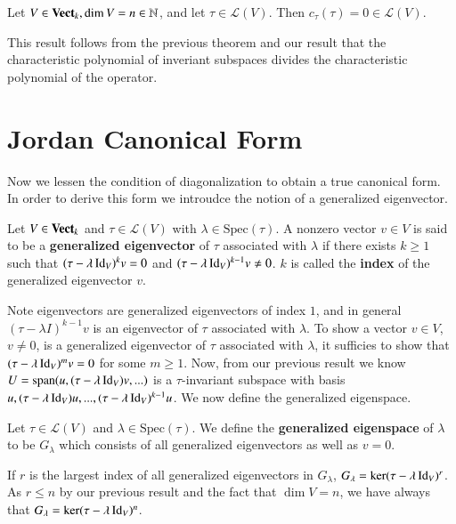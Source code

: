 \begin{theorem}
    Let $V \in \normalfont\textbf{Vect}_{k},\dim V = n\in \mathbb N$, and let $\tau \in \mathcal{L}(V)$. Then $c_{\tau}(\tau) = 0 \in \mathcal{L}(V)$.
\end{theorem}

This result follows from the previous theorem and our result that the characteristic polynomial of inveriant subspaces divides the characteristic polynomial of the operator.


\section{Jordan Canonical Form}\label{sec:Jord}

Now we lessen the condition of diagonalization to obtain a true canonical form. In order to derive this form we introudce the notion of a generalized eigenvector.

\begin{definition}
    Let $V \in \normalfont\textbf{Vect}_{k}$ and $\tau \in \mathcal{L}(V)$ with $\lambda \in \text{Spec}(\tau)$. A nonzero vector $v \in V$ is said to be a \textbf{generalized eigenvector} of $\tau$ associated with $\lambda$ if there exists $k \geq 1$ such that $(\tau-\lambda \operatorname{Id}_V)^kv = 0$ and $(\tau - \lambda \operatorname{Id}_V)^{k-1}v \neq 0$. $k$ is called the \textbf{index} of the generalized eigenvector $v$.
\end{definition}

Note eigenvectors are generalized eigenvectors of index $1$, and in general $(\tau-\lambda I)^{k-1}v$ is an eigenvector of $\tau$ associated with $\lambda$. To show a vector $v \in V$, $v\neq 0$, is a generalized eigenvector of $\tau$ associated with $\lambda$, it sufficies to show that $(\tau - \lambda \operatorname{Id}_V)^mv = 0$ for some $m \geq 1$. Now, from our previous result we know $U = \operatorname{span}(u,(\tau - \lambda \operatorname{Id}_V)v,...)$ is a $\tau$-invariant subspace with basis $u,(\tau-\lambda \operatorname{Id}_V)u,...,(\tau-\lambda\operatorname{Id}_V)^{k-1}u$. We now define the generalized eigenspace.

\begin{definition}
    Let $\tau \in \mathcal{L}(V)$ and $\lambda \in \text{Spec}(\tau)$. We define the \textbf{generalized eigenspace} of $\lambda$ to be $G_{\lambda}$ which consists of all generalized eigenvectors as well as $v = 0$.
\end{definition}

If $r$ is the largest index of all generalized eigenvectors in $G_{\lambda}$, $G_{\lambda} = \ker (\tau - \lambda \operatorname{Id}_V)^r$. As $r \leq n$ by our previous result and the fact that $\dim V = n$, we have always that $G_{\lambda} = \ker (\tau - \lambda \operatorname{Id}_V)^n$. 

